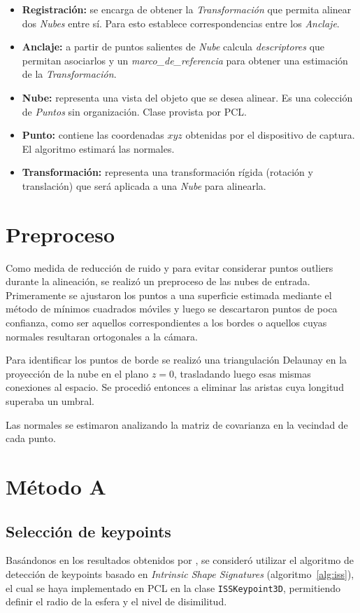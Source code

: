 		\begin{itemize}
			\item {\bfseries Registración:} se encarga de obtener la \emph{Transformación} que
				permita alinear dos \emph{Nubes} entre sí.  Para esto establece
				correspondencias entre los \emph{Anclaje}.
			\item {\bfseries Anclaje:} a partir de puntos salientes de \emph{Nube} calcula
				\emph{descriptores}  que permitan asociarlos y un
				\emph{marco\_de\_referencia} para obtener una estimación de la
				\emph{Transformación}.
			\item {\bfseries Nube:} representa una vista del objeto que se desea alinear.
				Es una colección de \emph{Puntos} sin organización. Clase
				provista por PCL.
			\item {\bfseries Punto:} contiene las coordenadas $xyz$ obtenidas por el
				dispositivo de captura. El algoritmo estimará las normales.
			\item {\bfseries Transformación:} representa una transformación rígida
				(rotación y translación) que será aplicada a una \emph{Nube}
				para alinearla.
		\end{itemize}

	\section{Preproceso}
		Como medida de reducción de ruido y para evitar considerar puntos outliers
		durante la alineación, se realizó un preproceso de las nubes de entrada.
		Primeramente se ajustaron los puntos a una superficie estimada mediante el
		método de mínimos cuadrados móviles y luego se descartaron puntos de poca
		confianza, como ser aquellos correspondientes a los bordes o aquellos cuyas
		normales resultaran ortogonales a la cámara.

		Para identificar los puntos de borde se realizó una triangulación
		Delaunay en la proyección de la nube en el plano $z=0$, trasladando
		luego esas mismas conexiones al espacio.
		Se procedió entonces a eliminar las aristas cuya longitud superaba un umbral.

		Las normales se estimaron analizando la matriz de covarianza en la vecindad de cada punto.

	\section{Método A}
		\subsection{Selección de keypoints}
			Basándonos en los resultados obtenidos por \cite{ISS},
			se consideró utilizar el algoritmo de detección de keypoints basado en \emph{Intrinsic Shape Signatures} (algoritmo~\ref{alg:iss}),
			el cual se haya implementado en PCL en la clase \texttt{ISSKeypoint3D}, permitiendo
			definir el radio de la esfera y el nivel de disimilitud.

